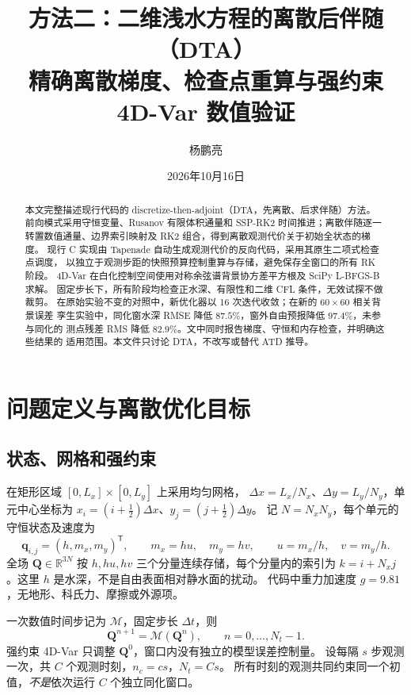 \documentclass[12pt,a4paper]{article}
\title{方法二：二维浅水方程的离散后伴随（DTA）\\
\large 精确离散梯度、检查点重算与强约束 4D-Var 数值验证}
\author{杨鹏亮}
\date{2026年10月16日}
\newcommand{\Q}{\mathbf{Q}}
\newcommand{\q}{\mathbf{q}}
\newcommand{\R}{\mathbb{R}}
\newcommand{\trans}{^{\mathsf T}}
\begin{document}
\maketitle
\begin{abstract}
本文完整描述现行代码的 discretize-then-adjoint（DTA，先离散、后求伴随）方法。
前向模式采用守恒变量、Rusanov 有限体积通量和 SSP-RK2 时间推进；离散伴随逐一
转置数值通量、边界索引映射及 RK2 组合，得到离散观测代价关于初始全状态的梯度。
现行 C 实现由 Tapenade 自动生成观测代价的反向代码，采用其原生二项式检查点调度，
以独立于观测步距的快照预算控制重算与存储，避免保存全窗口的所有 RK 阶段。
4D-Var 在白化控制空间使用对称余弦谱背景协方差平方根及 SciPy L-BFGS-B 求解。
固定步长下，所有阶段均检查正水深、有限性和二维 CFL 条件，无效试探不做裁剪。
在原始实验不变的对照中，新优化器以 16 次迭代收敛；在新的 $60\times60$ 相关背景误差
孪生实验中，同化窗水深 RMSE 降低 $87.5\%$，窗外自由预报降低 $97.4\%$，未参与同化的
测点残差 RMS 降低 $82.9\%$。文中同时报告梯度、守恒和内存检查，并明确这些结果的
适用范围。本文件只讨论 DTA，不改写或替代 ATD 推导。
\end{abstract}
\tableofcontents
\clearpage

\section{问题定义与离散优化目标}
\label{sec:dta-problem}

\subsection{状态、网格和强约束}

在矩形区域 $[0,L_x]\times[0,L_y]$ 上采用均匀网格，
$\Delta x=L_x/N_x$、$\Delta y=L_y/N_y$，单元中心坐标为
$x_i=(i+\tfrac12)\Delta x$、$y_j=(j+\tfrac12)\Delta y$。
记 $N=N_xN_y$，每个单元的守恒状态及速度为
\begin{equation}
 \q_{i,j}=(h,m_x,m_y)\trans,\qquad m_x=hu,\quad m_y=hv,
 \qquad u=m_x/h,\quad v=m_y/h.
 \label{eq:dta-state}
\end{equation}
全场 $\Q\in\R^{3N}$ 按 $h,hu,hv$ 三个分量连续存储，每个分量内的索引为
$k=i+N_xj$。这里 $h$ 是水深，不是自由表面相对静水面的扰动。
代码中重力加速度 $g=9.81$，无地形、科氏力、摩擦或外源项。

一次数值时间步记为 $\mathcal M$，固定步长 $\Delta t$，则
\begin{equation}
 \Q^{n+1}=\mathcal M(\Q^n),\qquad n=0,\ldots,N_t-1.
 \label{eq:dta-model-map}
\end{equation}
强约束 4D-Var 只调整 $\Q^0$，窗口内没有独立的模型误差控制量。
设每隔 $s$ 步观测一次，共 $C$ 个观测时刻，$n_c=cs$，$N_t=Cs$。
所有时刻的观测共同约束同一个初值，\emph{不是}依次运行 $C$ 个独立同化窗口。
\end{document}

